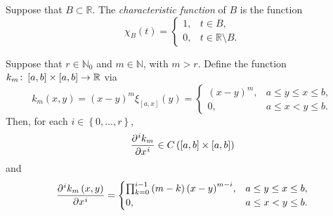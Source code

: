 \begin{frame}
    \begin{definition}
        Suppose that $B\subset\mathbb{R}$.
        The \emph{characteristic function} of $B$ is the function
        \begin{equation*}
            \chi_{B}\left(t\right)=
            \begin{cases}
                1, & t\in B,                    \\
                0, & t\in\mathbb{R}\setminus B.
            \end{cases}
        \end{equation*}
    \end{definition}
\end{frame}

\begin{frame}
    \begin{theorem}[kernel]
        Suppose that $r\in\mathbb{N}_{0}$ and $m\in\mathbb{N}$, with
        $m>r$.
        Define the function
        \begin{math}
            k_{m}\colon
            \left[a,b\right]\times\left[a,b\right]\to
            \mathbb{R}
        \end{math}
        via
        \begin{equation*}
            k_{m}\left(x,y\right)=
                {\left(x-y\right)}^{m}
            \xi_{\left[a,x\right]}\left(y\right)=
            \begin{cases}
                \left(x-y\right)^{m}, & a\leq y\leq x\leq b, \\
                0,                    & a\leq x< y\leq b.
            \end{cases}
        \end{equation*}
        Then, for each $i\in\left\{0,\dotsc,r\right\}$,
        \begin{equation*}
            \diffp[i]{k_{m}}{x}\in
            C\left(\interval\times\interval\right)
        \end{equation*}
        and
        \begin{equation*}
            \diffp[i]{k_{m}\left(x,y\right)}{x}=
            \begin{cases}
                \prod_{k=0}^{i-1}
                \left(m-k\right)
                {\left(x-y\right)}^{m-i}, & a\leq y\leq x\leq b, \\
                0,                        & a\leq x< y\leq b.
            \end{cases}
        \end{equation*}
    \end{theorem}
\end{frame}

